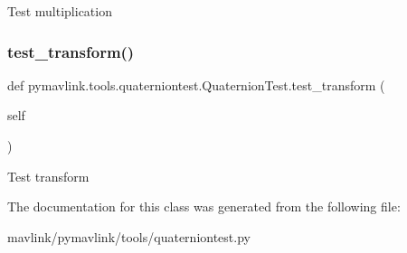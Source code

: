 \begin{DoxyVerb}Test multiplication\end{DoxyVerb}
 \mbox{\label{classpymavlink_1_1tools_1_1quaterniontest_1_1QuaternionTest_a38e3059967c47c61c00ae3625f504f71}} 
\subsubsection{\texorpdfstring{test\+\_\+transform()}{test\_transform()}}
{\footnotesize\ttfamily def pymavlink.\+tools.\+quaterniontest.\+Quaternion\+Test.\+test\+\_\+transform (\begin{DoxyParamCaption}\item[{}]{self }\end{DoxyParamCaption})}

\begin{DoxyVerb}Test transform\end{DoxyVerb}
 

The documentation for this class was generated from the following file\+:\begin{DoxyCompactItemize}
\item 
mavlink/pymavlink/tools/quaterniontest.\+py\end{DoxyCompactItemize}

